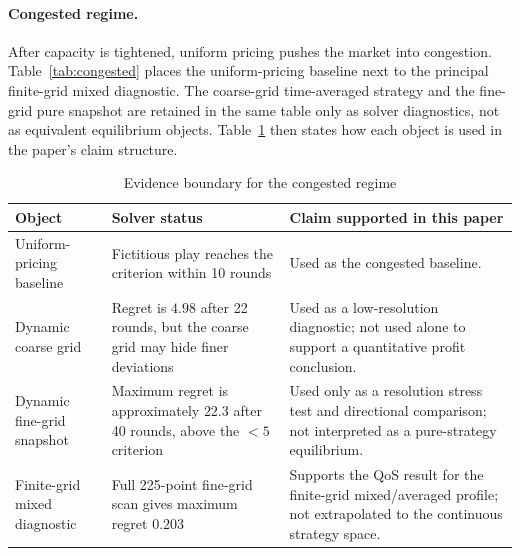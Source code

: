 \documentclass[11pt,a4paper]{article}
\begin{document}
\paragraph{Congested regime.}

After capacity is tightened, uniform pricing pushes the market into congestion. Table~\ref{tab:congested} places the uniform-pricing baseline next to the principal finite-grid mixed diagnostic. The coarse-grid time-averaged strategy and the fine-grid pure snapshot are retained in the same table only as solver diagnostics, not as equivalent equilibrium objects. Table~\ref{tab:evidence_boundary} then states how each object is used in the paper's claim structure.

\begin{table}[H]
\centering
\caption{Congested regime: main comparison and solver-diagnostic snapshots}
\label{tab:congested}
\small
{}
\end{table}

\begin{table}[H]
\centering
\caption{Evidence boundary for the congested regime}
\label{tab:evidence_boundary}
\small
\begin{tabular}{p{}p{}p{}}
\toprule
Object & Solver status & Claim supported in this paper \\
\midrule
Uniform-pricing baseline & Fictitious play reaches the criterion within 10 rounds & Used as the congested baseline. \\
Dynamic coarse grid & Regret is $4.98$ after 22 rounds, but the coarse grid may hide finer deviations & Used as a low-resolution diagnostic; not used alone to support a quantitative profit conclusion. \\
Dynamic fine-grid snapshot & Maximum regret is approximately $22.3$ after 40 rounds, above the $<5$ criterion & Used only as a resolution stress test and directional comparison; not interpreted as a pure-strategy equilibrium. \\
Finite-grid mixed diagnostic & Full 225-point fine-grid scan gives maximum regret $0.203$ & Supports the QoS result for the finite-grid mixed/averaged profile; not extrapolated to the continuous strategy space. \\
\bottomrule
\end{tabular}
\end{table}
\end{document}
